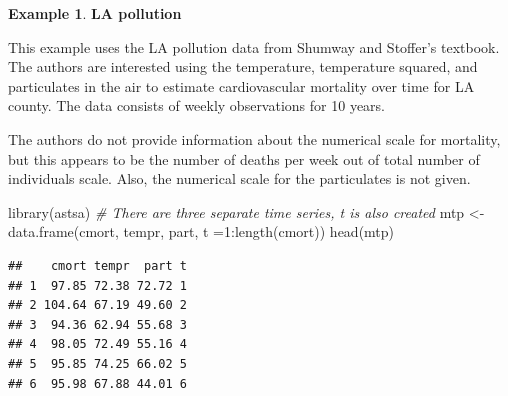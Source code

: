 \documentclass[
]{book}
\newenvironment{Shaded}{\begin{snugshade}}{\end{snugshade}}
\newcommand{\AttributeTok}[1]{\textcolor[rgb]{0.77,0.63,0.00}{#1}}
\newcommand{\CommentTok}[1]{\textcolor[rgb]{0.56,0.35,0.01}{\textit{#1}}}
\newcommand{\DecValTok}[1]{\textcolor[rgb]{0.00,0.00,0.81}{#1}}
\newcommand{\FunctionTok}[1]{\textcolor[rgb]{0.00,0.00,0.00}{#1}}
\newcommand{\NormalTok}[1]{#1}
\newcommand{\OtherTok}[1]{\textcolor[rgb]{0.56,0.35,0.01}{#1}}
\newcommand{\SpecialCharTok}[1]{\textcolor[rgb]{0.00,0.00,0.00}{#1}}
\newcommand{\StringTok}[1]{\textcolor[rgb]{0.31,0.60,0.02}{#1}}
\theoremstyle{definition}
\theoremstyle{definition}
\newtheorem{example}{Example}[chapter]
\theoremstyle{definition}
\theoremstyle{definition}
\theoremstyle{remark}
\begin{document}
\begin{example}
\textbf{LA pollution}

This example uses the LA pollution data from Shumway and Stoffer's textbook. The authors are interested using the temperature, temperature squared, and particulates in the air to estimate cardiovascular mortality over time for LA county. The data consists of weekly observations for 10 years.

The authors do not provide information about the numerical scale for mortality, but this appears to be the number of deaths per week out of total number of individuals scale. Also, the numerical scale for the particulates is not given.

\begin{Shaded}
\begin{Highlighting}[]
\FunctionTok{library}\NormalTok{(astsa)}
\CommentTok{\# There are three separate time series, t is also created}
\NormalTok{mtp }\OtherTok{\textless{}{-}} \FunctionTok{data.frame}\NormalTok{(cmort, tempr, part, }\AttributeTok{t =}\DecValTok{1}\SpecialCharTok{:}\FunctionTok{length}\NormalTok{(cmort))}
\FunctionTok{head}\NormalTok{(mtp)}
\end{Highlighting}
\end{Shaded}

\begin{verbatim}
##    cmort tempr  part t
## 1  97.85 72.38 72.72 1
## 2 104.64 67.19 49.60 2
## 3  94.36 62.94 55.68 3
## 4  98.05 72.49 55.16 4
## 5  95.85 74.25 66.02 5
## 6  95.98 67.88 44.01 6
\end{verbatim}

\begin{Shaded}
\end{Shaded}
\end{example}
\end{document}
